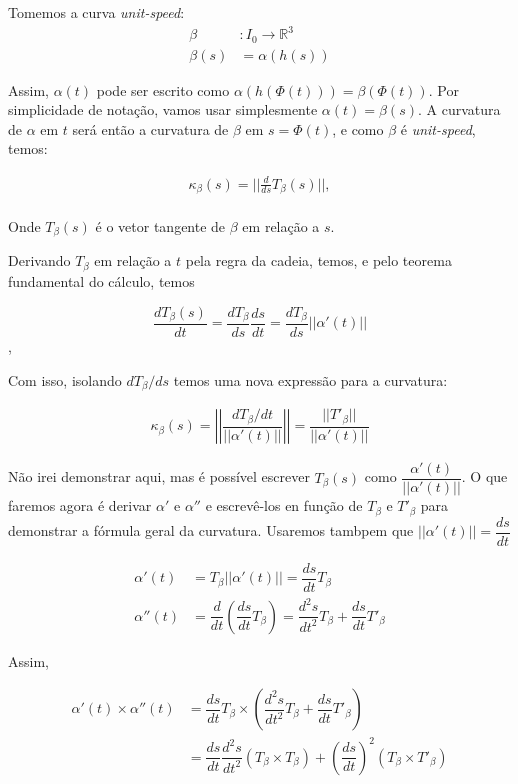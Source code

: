 \documentclass[12pt,letterpaper]{article}
\newcommand{\real}{\mathbb{R}}
\begin{document}
\begin{enumerate}
	
	Tomemos a curva \textit{unit-speed}:
	\begin{align*}
		\beta&:I_0\to\real^3\\
		\beta(s)&=\alpha(h(s))
	\end{align*}
	
	Assim, $\alpha(t)$ pode ser escrito como $\alpha(h(\Phi(t)))=\beta(\Phi(t))$. Por simplicidade de notação, vamos usar simplesmente $\alpha(t)=\beta(s)$. 
	A curvatura de $\alpha$ em $t$ será então a curvatura de $\beta$ em $s=\Phi(t)$, e como $\beta$ é \textit{unit-speed}, temos:
	
	\begin{align*}
		\kappa_\beta(s)=||\frac{d}{ds}T_\beta(s)||,\\
	\end{align*}
	
	Onde $T_\beta(s)$ é o vetor tangente de $\beta$ em relação a $s$.
	
	Derivando $T_\beta$ em relação a $t$ pela regra da cadeia, temos, e pelo teorema fundamental do cálculo, temos
	
	$$\dfrac{dT_\beta(s)}{dt}=\dfrac{dT_\beta}{ds}\dfrac{ds}{dt}=\dfrac{dT_\beta}{ds}||\alpha'(t)||$$,
	
	Com isso, isolando $dT_\beta/ds$ temos uma nova expressão para a curvatura:
	
	\begin{align}\kappa_\beta(s)=\left|\left|\dfrac{dT_\beta/dt}{||\alpha'(t)||}\right|\right|=\dfrac{||T'_\beta||}{||\alpha'(t)||}\label{curvature}
	\end{align}
	
	Não irei demonstrar aqui, mas é possível escrever $T_\beta(s)$ como $\dfrac{\alpha'(t)}{||\alpha'(t)||}$. O que faremos agora é derivar $\alpha'$ e $\alpha''$ e escrevê-los en função de $T_\beta$ e $T'_\beta$ para demonstrar a fórmula geral da curvatura. Usaremos tambpem que $||\alpha'(t)||=\dfrac{ds}{dt}$
	
	\begin{align*}
		\alpha'(t)&=T_\beta||\alpha'(t)||=\dfrac{ds}{dt}T_\beta\\
		\alpha''(t)&=\dfrac{d}{dt}\left(\dfrac{ds}{dt}T_\beta\right)=\dfrac{d^2s}{dt^2}T_\beta+\dfrac{ds}{dt}T'_\beta
	\end{align*}

	Assim,
	
	\begin{align*}
		\alpha'(t)\times\alpha''(t)&=\dfrac{ds}{dt}T_\beta\times\left(\dfrac{d^2s}{dt^2}T_\beta+\dfrac{ds}{dt}T'_\beta\right)\\
		&=\dfrac{ds}{dt}\dfrac{d^2s}{dt^2}(T_\beta\times T_\beta)+\left(\dfrac{ds}{dt}\right)^2(T_\beta\times T'_\beta)
	\end{align*}


\end{enumerate}
\end{document}
